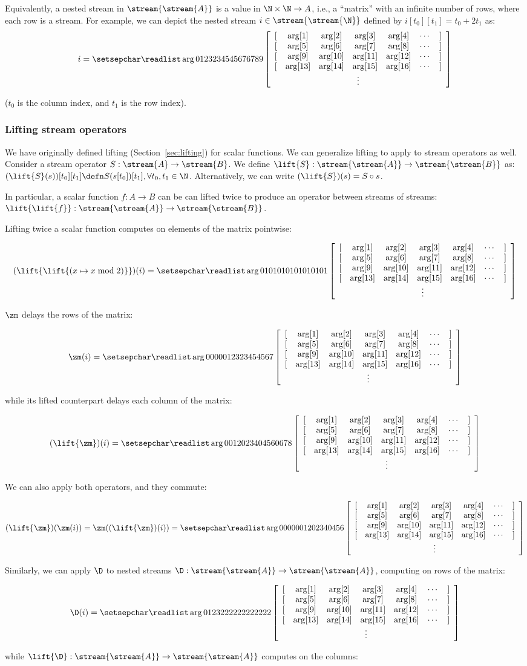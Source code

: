 Equivalently, a nested stream in $\stream{\stream{A}}$ is a value in
$\N \times \N \to A$, i.e., a ``matrix''
with an infinite number of rows, where each row is a stream.
For example, we can depict the nested stream
$i \in \stream{\stream{\N}}$ defined by $i[t_0][t_1] = t_0 + 2 t_1$ as:
$$ i = \ssa{0 1 2 3 2 3 4 5 4 5 6 7 6 7 8 9} $$

\noindent ($t_0$ is the column index, and $t_1$ is the row index).

\subsubsection{Lifting stream operators}

We have originally defined lifting (Section~\ref{sec:lifting}) for scalar functions.
We can generalize lifting to apply to stream operators as well.  Consider a
stream operator $S: \stream{A} \to \stream{B}$.  We define $\lift{S}: \stream{\stream{A}}
\to \stream{\stream{B}}$ as: $(\lift{S}(s))[t_0][t_1] \defn S(s[t_0])[t_1], \forall t_0, t_1 \in
\N$.  Alternatively, we can write $(\lift{S})(s) = S \circ s$.

In particular, a scalar function $f: A \rightarrow B$ can be can lifted twice to
produce an operator between streams of streams: $\lift{\lift{f}}: \stream{\stream{A}}
\rightarrow \stream{\stream{B}}$.

Lifting twice a scalar function computes on elements of the matrix pointwise:

$$(\lift{\lift{(x \mapsto x \bmod 2)}})(i) =
  \ssa{0 1 0 1 0 1 0 1 0 1 0 1 0 1 0 1}
$$

$\zm$ delays the rows of the matrix:

$$\zm(i) = \ssa{0 0 0 0 0 1 2 3 2 3 4 5 4 5 6 7}$$

\noindent while its lifted counterpart delays each column of the matrix:

$$(\lift{\zm})(i) = \ssa{0 0 1 2 0 2 3 4 0 4 5 6 0 6 7 8}$$

We can also apply both operators, and they commute:

$$(\lift{\zm})(\zm(i)) = \zm((\lift{\zm})(i)) = \ssa{0 0 0 0 0 0 1 2 0 2 3 4 0 4 5 6}$$

Similarly, we can apply $\D$ to nested streams $\D : \stream{\stream{A}} \to
\stream{\stream{A}}$, computing on rows of the matrix:

$$\D(i) = \ssa{0 1 2 3 2 2 2 2 2 2 2 2 2 2 2 2}$$

\noindent while $\lift{\D} : \stream{\stream{A}} \to \stream{\stream{A}}$
computes on the columns:

